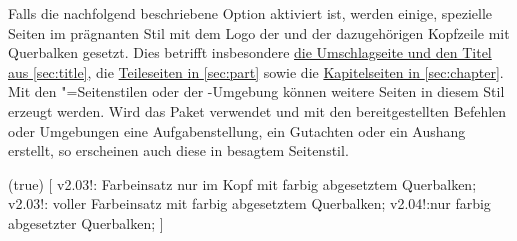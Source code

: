 \begin{DeclareEntity*}{}
\begin{DeclareEntity*}{}
\begin{DeclareEntity*}{}
Falls die nachfolgend beschriebene Option  aktiviert ist, 
werden einige, spezielle Seiten im prägnanten Stil mit dem Logo der \TnUD und 
der dazugehörigen Kopfzeile mit Querbalken gesetzt. Dies betrifft insbesondere 
\hyperref[sec:title]{die Umschlagseite und den Titel aus \autoref*{sec:title}}, 
die \hyperref[sec:part]{Teileseiten in \autoref*{sec:part}} sowie die
\hyperref[sec:chapter]{Kapitelseiten in \autoref*{sec:chapter}}. Mit den 
"=Seitenstilen oder der -Umgebung 
können weitere Seiten in diesem Stil erzeugt werden. Wird das Paket 
 verwendet und mit den bereitgestellten Befehlen oder 
Umgebungen eine Aufgabenstellung, ein Gutachten oder ein Aushang erstellt, so 
erscheinen auch diese in besagtem Seitenstil.
%
\begin{Declaration}
  {}
  (true)
[%
  v2.03!:%
    Farbeinsatz nur im Kopf mit farbig abgesetztem Querbalken;
  v2.03!:%
    voller Farbeinsatz mit farbig abgesetztem Querbalken;%
  v2.04!:nur farbig abgesetzter Querbalken;%
]


\end{Declaration}
\end{DeclareEntity*}
\end{DeclareEntity*}
\end{DeclareEntity*}
